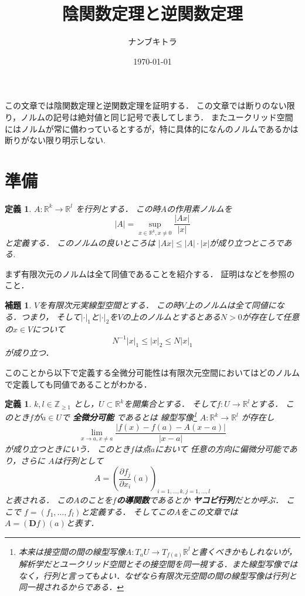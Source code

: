 \documentclass[leqno, a4paper, 12pt]{jsarticle}
\title{
陰関数定理と逆関数定理
}
\author{ナンブキトラ}
\date{\today}
\newtheorem{lem}[thm]{補題}
\newtheorem{df}[thm]{定義}
\newcommand{\zz}{\mathbb{Z}}
\newcommand{\rr}{\mathbb{R}}
\newcommand{\ddd}{\mathbf{D}}
\begin{document}
\maketitle


この文章では陰関数定理と逆関数定理を証明する．
この文章では断りのない限り，ノルムの記号は絶対値と同じ記号で表してしまう．
またユークリッド空間にはノルムが常に備わっているとするが，特に具体的になんのノルムであるかは断りがない限り明示しない.


\section{準備}

\begin{df}
$A: \rr^{k}\to \rr^{l}$
を行列とする．
この時$A$の作用素ノルムを
\[
|A|=\sup_{x\in \rr^{k}, x\neq 0}\frac{|Ax|}{|x|}
\]
と定義する．
このノルムの良いところは
$|Ax|\le |A|\cdot |x|$が成り立つところである.

\end{df}

まず有限次元のノルムは全て同値であることを紹介する．
証明は\cite{2}などを参照のこと．

\begin{lem}
$V$を有限次元実線型空間とする．
この時$V$上のノルムは全て同値になる．つまり，
そして$|\cdot|_{1}$と$|\cdot |_{2}$を$V$の上のノルムとするとある$N>0$が存在して任意の$x\in V$について
\[
N^{-1}|x|_{1}\le |x|_{2}\le N|x|_{1}
\]
が成り立つ．
\end{lem}
このことから以下で定義する全微分可能性は有限次元空間においてはどのノルムで定義しても同値であることがわかる．


\begin{df}
$k, l\in \zz_{\ge 1}$
とし，$U\subset \rr^{k}$を開集合とする．
そして$f: U\to \rr^{l}$とする．
このとき$f$が$a\in U$で
\textbf{全微分可能}
であるとは
線型写像\footnote{本来は接空間の間の線型写像$A: T_{a}U\to T_{f(a)}\rr^{l}$と書くべきかもしれないが，解析学だとユークリッド空間とその接空間を同一視する．また線型写像ではなく，行列と言ってもよい．なぜなら有限次元空間の間の線型写像は行列と同一視されるからである．}
$A: \rr^{k}\to \rr^{l}$
が存在し
\[
\lim_{x\to a, x\neq a}
\frac{|f(x)-f(a)-A(x-a)|}{|x-a|}
\]
が成り立つときにいう．
このとき$f$は点$a$において
任意の方向に偏微分可能であり，さらに
$A$は行列として
\[
A=\left(\frac{\partial f_{j}}{\partial x_{i}}(a)\right)_{i=1, \dots, k, j=1, \dots, l}
\]
と表される．
この$A$のことを\textbf{$f$の導関数}であるとか
\textbf{ヤコビ行列}だとか呼ぶ．
ここで
$f=(f_{1}, \dots, f_{l})$と定義する．
そしてこの$A$をこの文章では
$A=(\ddd f)(a)$と表す．
\end{df}
\end{document}
